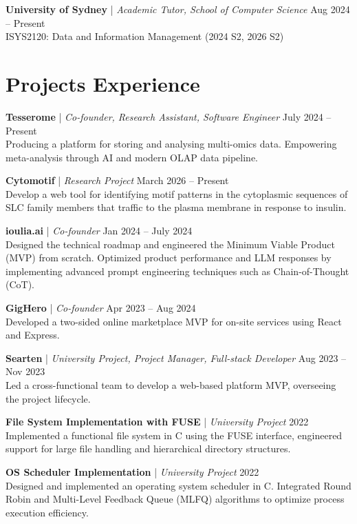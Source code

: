 \documentclass[10pt, a4paper]{article}
\newcommand{\ExperienceEntry}[4]{
  \noindent \textbf{#1} | \textit{#3} \hfill #2 \\
  {\small #4} \par
  \vspace{4pt}
}
\begin{document}
\ExperienceEntry{University of Sydney}{Aug 2024 -- Present}
{Academic Tutor, School of Computer Science}
{ISYS2120: Data and Information Management (2024 S2, 2026 S2)}

\section{Projects Experience}

\ExperienceEntry{Tesserome}{July 2024 -- Present}
{Co-founder, Research Assistant, Software Engineer}
{Producing a platform for storing and analysing multi-omics data. Empowering meta-analysis through AI and modern OLAP data pipeline.}

\ExperienceEntry{Cytomotif}{March 2026 -- Present}
{Research Project}
{Develop a web tool for identifying motif patterns in the cytoplasmic sequences of SLC family members that traffic to the plasma membrane in response to insulin.}

\ExperienceEntry{ioulia.ai}{Jan 2024 -- July 2024}
{Co-founder}
{Designed the technical roadmap and engineered the Minimum Viable Product (MVP) from scratch. 
Optimized product performance and LLM responses by implementing advanced prompt engineering techniques such as Chain-of-Thought (CoT).}

\ExperienceEntry{GigHero}{Apr 2023 -- Aug 2024}
{Co-founder}
{Developed a two-sided online marketplace MVP for on-site services using React and Express.}

\ExperienceEntry{Searten}{Aug 2023 -- Nov 2023}
{University Project, Project Manager, Full-stack Developer}
{Led a cross-functional team to develop a web-based platform MVP, overseeing the project lifecycle.}

\ExperienceEntry{File System Implementation with FUSE}{2022}
{University Project}
{Implemented a functional file system in C using the FUSE interface, 
engineered support for large file handling and hierarchical directory structures.}

\ExperienceEntry{OS Scheduler Implementation}{2022}
{University Project}
{Designed and implemented an operating system scheduler in C.
Integrated Round Robin and Multi-Level Feedback Queue (MLFQ) algorithms to optimize process execution efficiency.}
\end{document}
